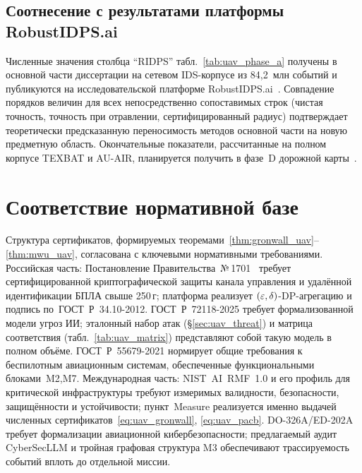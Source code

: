 \subsection{Соотнесение с результатами платформы \textsf{RobustIDPS.ai}}
Численные значения столбца ``RIDPS'' табл.~\ref{tab:uav_phase_a}
получены в основной части диссертации на сетевом IDS-корпусе из
84{,}2~млн событий и публикуются на исследовательской платформе
\textsf{RobustIDPS.ai}~\cite{robustidps_zenodo}. Совпадение порядков
величин для всех непосредственно сопоставимых строк (чистая точность,
точность при отравлении, сертифицированный радиус) подтверждает
теоретически предсказанную переносимость методов основной части на
новую предметную область. Окончательные показатели, рассчитанные на
полном корпусе TEXBAT и AU-AIR, планируется получить в фазе~D
дорожной карты~\cite{uav_proposal_2026}.

\section{Соответствие нормативной базе}
\label{sec:uav_regulation}

Структура сертификатов, формируемых
теоремами~\ref{thm:gronwall_uav}--\ref{thm:mwu_uav}, согласована с
ключевыми нормативными требованиями. Российская часть:
Постановление Правительства~№\,1701~\cite{decree_1701} требует
сертифицированной криптографической защиты канала управления и
удалённой идентификации БПЛА свыше 250\,г; платформа реализует
$(\varepsilon,\delta)$-DP-агрегацию и подпись по~ГОСТ~Р~34.10-2012.
\mbox{ГОСТ~Р~72118-2025} требует формализованной модели угроз ИИ;
эталонный набор атак (\S\ref{sec:uav_threat}) и матрица соответствия
(табл.~\ref{tab:uav_matrix}) представляют собой такую модель в
полном объёме. \mbox{ГОСТ~Р~55679-2021} нормирует общие требования к
беспилотным авиационным системам, обеспеченные функциональными
блоками~\textsf{M2,M7}. Международная часть: \mbox{NIST~AI~RMF~1.0}
\cite{nist_rmf} и его профиль для критической инфраструктуры
требуют измеримых валидности, безопасности, защищённости и
устойчивости; пункт~\textsf{Measure} реализуется именно
выдачей численных сертификатов~\eqref{eq:uav_gronwall},
\eqref{eq:uav_pacb}. \mbox{DO-326A/ED-202A}~\cite{do_326a} требует
формализации авиационной кибербезопасности; предлагаемый аудит
\textsf{CyberSecLLM} и тройная графовая структура \textsf{M3}
обеспечивают трассируемость событий вплоть до отдельной миссии.

